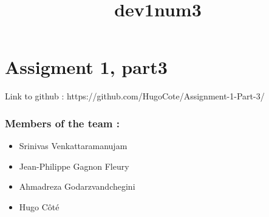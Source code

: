 \documentclass[11pt]{article}
\title{dev1num3}
\providecommand{\tightlist}{%
      \setlength{\itemsep}{0pt}\setlength{\parskip}{0pt}}
\begin{document}
    
    
    \maketitle
    
    

    
    \section{Assigment 1, part3}\label{assigment-1-part3}

Link to github : https://github.com/HugoCote/Assignment-1-Part-3/

\subsubsection{Members of the team :}\label{members-of-the-team}

\begin{itemize}
\tightlist
\item
  Srinivas Venkattaramanujam\\
\item
  Jean-Philippe Gagnon Fleury\\
\item
  Ahmadreza Godarzvandchegini\\
\item
  Hugo Côté
\end{itemize}
\end{document}
